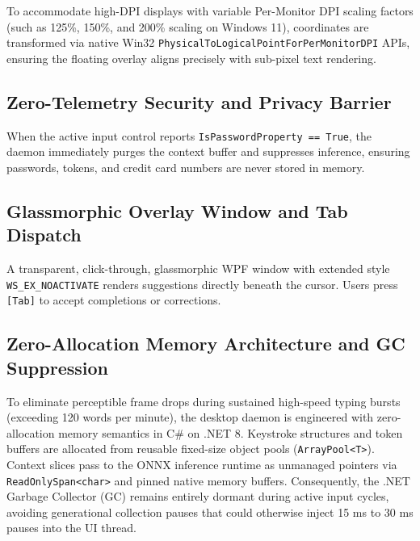 \documentclass[10pt,journal,compsoc]{IEEEtran}
\begin{document}
To accommodate high-DPI displays with variable Per-Monitor DPI scaling factors (such as 125\%, 150\%, and 200\% scaling on Windows 11), coordinates are transformed via native Win32 \texttt{PhysicalToLogicalPointForPerMonitorDPI} APIs, ensuring the floating overlay aligns precisely with sub-pixel text rendering.

\subsection{Zero-Telemetry Security and Privacy Barrier}
When the active input control reports \texttt{IsPasswordProperty == True}, the daemon immediately purges the context buffer and suppresses inference, ensuring passwords, tokens, and credit card numbers are never stored in memory.

\subsection{Glassmorphic Overlay Window and Tab Dispatch}
A transparent, click-through, glassmorphic WPF window with extended style \texttt{WS\_EX\_NOACTIVATE} renders suggestions directly beneath the cursor. Users press \texttt{[Tab]} to accept completions or corrections.

\subsection{Zero-Allocation Memory Architecture and GC Suppression}
To eliminate perceptible frame drops during sustained high-speed typing bursts (exceeding 120 words per minute), the desktop daemon is engineered with zero-allocation memory semantics in C\# on .NET 8. Keystroke structures and token buffers are allocated from reusable fixed-size object pools (\texttt{ArrayPool<T>}). Context slices pass to the ONNX inference runtime as unmanaged pointers via \texttt{ReadOnlySpan<char>} and pinned native memory buffers. Consequently, the .NET Garbage Collector (GC) remains entirely dormant during active input cycles, avoiding generational collection pauses that could otherwise inject 15 ms to 30 ms pauses into the UI thread.
\end{document}
